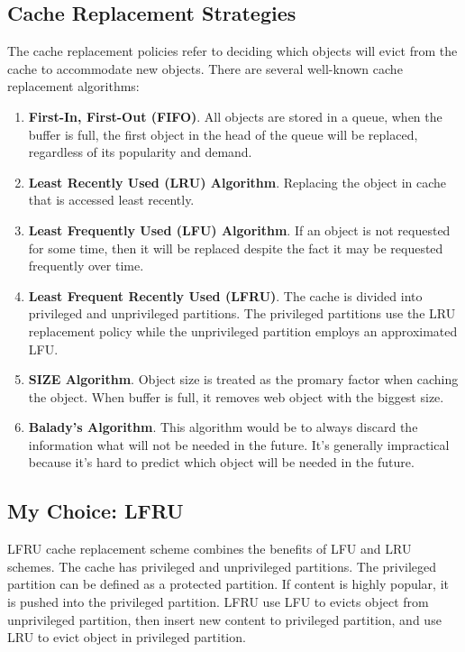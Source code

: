 \documentclass{elegantpaper}
\begin{document}
\subsection{Cache Replacement Strategies}
The cache replacement policies refer to deciding which objects will evict from the cache to accommodate new objects\cite{CaTech}. There are several well-known cache replacement algorithms: 
\begin{enumerate}
	\item \textbf{First-In, First-Out (FIFO)}. All objects are stored in a queue, when the buffer is full, the first object in the head of the queue will be replaced, regardless of its popularity and demand.
	
	\item \textbf{Least Recently Used (LRU) Algorithm}. Replacing the object in cache that is accessed least recently.
	
	\item \textbf{Least Frequently Used (LFU) Algorithm}. If an object is not requested for some time, then it will be replaced despite the fact it may be requested frequently over time\cite{Cache}.
	
	\item \textbf{Least Frequent Recently Used (LFRU)}. The cache is divided into privileged and unprivileged partitions. The privileged partitions use the LRU replacement policy while the unprivileged partition employs an approximated LFU\cite{7857720}. 
	
	\item \textbf{SIZE Algorithm}. Object size is treated as the promary factor when caching the object. When buffer is full, it removes web object with the biggest size\cite{8344541}.
	
	\item  \textbf{Balady's Algorithm}. This algorithm would be to always discard the information what will not be needed in the future. It's generally impractical because it's hard to predict which object will be needed in the future.
\end{enumerate}

\subsection{My Choice: LFRU}
LFRU cache replacement scheme combines the benefits of LFU and LRU schemes. The cache has privileged and unprivileged partitions. The privileged partition can be defined as a protected partition. If content is highly popular, it is pushed into the privileged partition. LFRU use LFU to evicts object from unprivileged partition, then insert new content to privileged partition, and use LRU to evict object in privileged partition.
\end{document}
